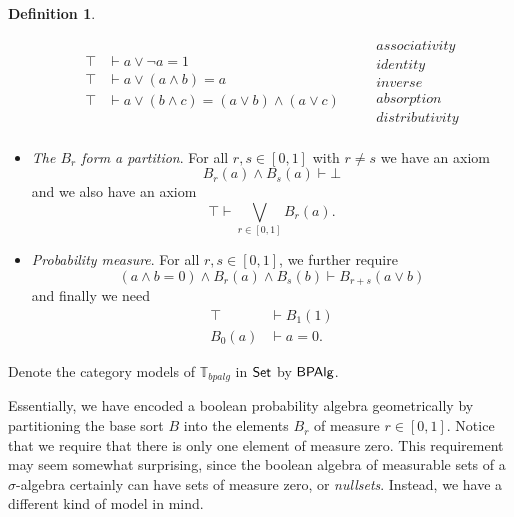 \documentclass[a4paper]{amsproc}
\theoremstyle{plain}
\theoremstyle{definition}
\newtheorem{definition}[theorem]{Definition}
\theoremstyle{remark}
\numberwithin{equation}{section}
\newcommand{\Set}{\textup{\textsf{Set}}}
\newcommand{\BPAlg}{\textup{\textsf{BPAlg}}}
\begin{document}
\begin{definition}
\begin{itemize}
\begin{equation*}
\begin{split}
                \top &\vdash a \vee \neg{a} = 1 \\
                \top &\vdash a \vee (a \wedge b) = a \\
                \top &\vdash a \vee (b \wedge c) = (a \vee b) \wedge (a \vee c) \\
            \end{split}
            \quad
            \begin{split}
                &\textit{associativity} \\
                &\textit{identity} \\
                &\textit{inverse} \\
                &\textit{absorption} \\
                &\textit{distributivity} \\
            \end{split}
        \end{equation*}
        \item \textit{The $B_r$ form a partition}. For all $r, s \in [0,1]$ with $r \neq s$ we have an axiom
        \[
        B_r(a)  \wedge B_s(a) \vdash \bot
        \]
        and we also have an axiom
        \[
        \top \vdash \bigvee_{r \in [0,1]} B_r(a).
        \]
        \item \textit{Probability measure}. For all $r, s \in [0,1]$, we further require
        \[
        (a \wedge b = 0) \wedge B_r(a) \wedge B_s(b) \vdash B_{r+s}(a \vee b)
        \]
        and finally we need
        \begin{align*}
            \top & \vdash B_1(1) \\
            B_0(a) & \vdash a = 0.
        \end{align*}
    \end{itemize}
    Denote the category models of $\mathbb{T}_{bpalg}$ in $\Set$ by $\BPAlg$.
\end{definition}

Essentially, we have encoded a boolean probability algebra geometrically by partitioning the base sort $B$ into the elements $B_r$ of measure $r \in [0,1]$. Notice that we require that there is only one element of measure zero. This requirement may seem somewhat surprising, since the boolean algebra of measurable sets of a $\sigma$-algebra certainly can have sets of measure zero, or \emph{nullsets}. Instead, we have a different kind of model in mind.
\end{document}
